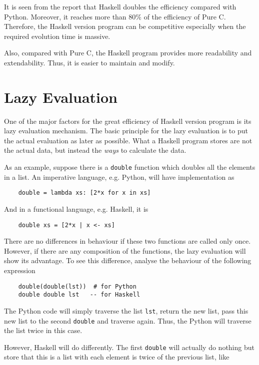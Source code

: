 \documentclass[11pt]{article}
\begin{document}
It is seen from the report that Haskell doubles the efficiency compared with Python. Moreover, it reaches more than $80\%$ of the efficiency of Pure C. Therefore, the Haskell version program can be competitive especially when the required evolution time is massive.

Also, compared with Pure C, the Haskell program provides more readability and extendability. Thus, it is easier to maintain and modify.

\section{Lazy Evaluation}

One of the major factors for the great efficiency of Haskell version program is its lazy evaluation mechanism. The basic principle for the lazy evaluation is to put the actual evaluation as later as possible. What a Haskell program stores are not the actual data, but instead the \emph{ways} to calculate the data. 

As an example, suppose there is a \lstinline{double} function which doubles all the elements in a list. An imperative language, e.g. Python, will have implementation as

\begin{lstlisting}
	double = lambda xs: [2*x for x in xs]
\end{lstlisting}

And in a functional language, e.g. Haskell, it is

\begin{lstlisting}
	double xs = [2*x | x <- xs]
\end{lstlisting}

There are no differences in behaviour if these two functions are called only once. However, if there are any composition of the functions, the lazy evaluation will show its advantage. To see this difference, analyse the behaviour of the following expression

\begin{lstlisting}
	double(double(lst))  # for Python
	double double lst   -- for Haskell
\end{lstlisting}

The Python code will simply traverse the list \lstinline{lst}, return the new list, pass this new list to the second \lstinline{double} and traverse again. Thus, the Python will traverse the list twice in this case.

However, Haskell will do differently. The first \lstinline{double} will actually do nothing but store that this is a list with each element is twice of the previous list, like
\end{document}
